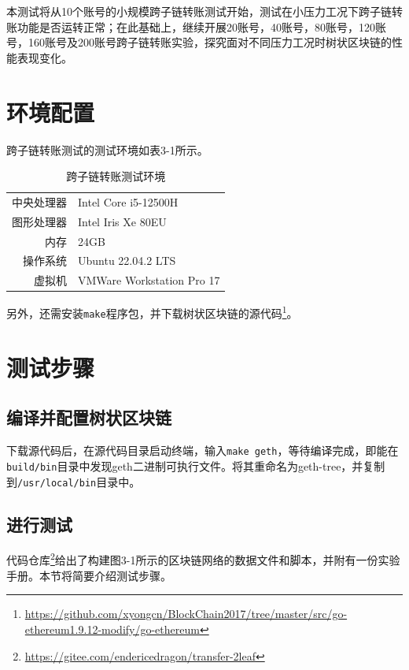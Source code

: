 本测试将从10个账号的小规模跨子链转账测试开始，测试在小压力工况下跨子链转账功能是否运转正常；在此基础上，继续开展20账号，40账号，80账号，120账号，160账号及200账号跨子链转账实验，探究面对不同压力工况时树状区块链的性能表现变化。

\section{环境配置}

跨子链转账测试的测试环境如表3-1所示。

\begin{table}[htbp]
    \linespread{1.5}
    \centering
    \caption{跨子链转账测试环境}\label{跨子链转账测试环境}
    \begin{tabular}{r|l} \toprule
        中央处理器 & Intel Core i5-12500H      \\
        图形处理器 & Intel Iris Xe 80EU        \\
        内存    & 24GB                      \\
        操作系统  & Ubuntu 22.04.2 LTS        \\
        虚拟机   & VMWare Workstation Pro 17 \\
        \bottomrule
    \end{tabular}
\end{table}

另外，还需安装\verb|make|程序包，并下载树状区块链的源代码\footnote{\url{https://github.com/xyongcn/BlockChain2017/tree/master/src/go-ethereum1.9.12-modify/go-ethereum}}。

\section{测试步骤}

\subsection{编译并配置树状区块链}

下载源代码后，在源代码目录启动终端，输入\verb|make geth|，等待编译完成，即能在\verb|build/bin|目录中发现geth二进制可执行文件。将其重命名为geth-tree，并复制到\verb|/usr/local/bin|目录中。

\subsection{进行测试}

代码仓库\footnote{\url{https://gitee.com/endericedragon/transfer-2leaf}}给出了构建图3-1所示的区块链网络的数据文件和脚本，并附有一份实验手册。本节将简要介绍测试步骤。

